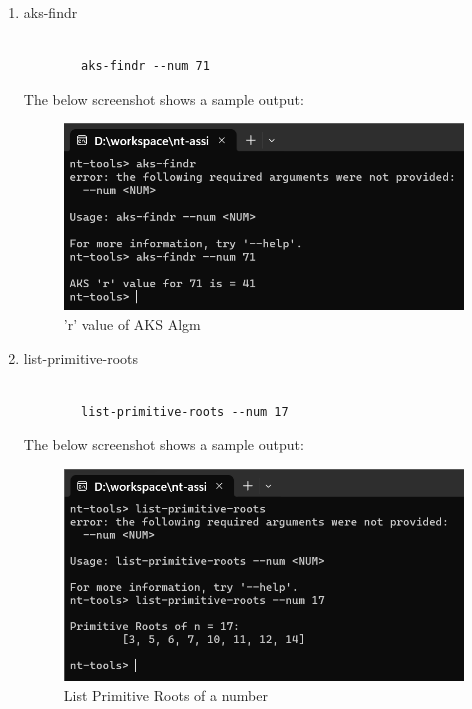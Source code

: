 \documentclass{article}
\begin{document}
\begin{enumerate}
        \item aks-findr
        \begin{lstlisting}[style=DOS]

        aks-findr --num 71
        \end{lstlisting}

        The below screenshot shows a sample output:
        \begin{figure}[H]
            \centering
            \includegraphics[scale=0.4]{aks-findr.png}
            \caption{'r' value of AKS Algm}
        \end{figure}

        \item list-primitive-roots
        \begin{lstlisting}[style=DOS]

        list-primitive-roots --num 17
        \end{lstlisting}

        The below screenshot shows a sample output:
        \begin{figure}[H]
            \centering
            \includegraphics[scale=0.4]{list_primitive-roots.png}
            \caption{List Primitive Roots of a number}
        \end{figure}


\end{enumerate}
\end{document}
